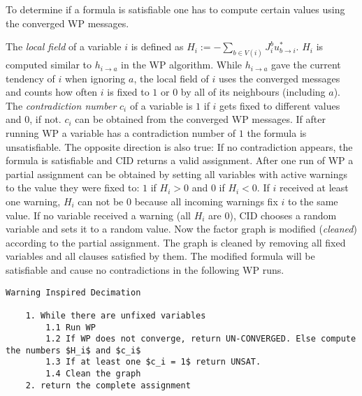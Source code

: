 To determine if a formula is satisfiable one has to compute certain values using the converged WP messages.

The \emph{local field} of a variable $i$ is defined as $H_i := - \sum_{b \in V(i)} J_i^b u^\ast_{b\rightarrow i}$. \newline $H_i$ is computed similar to $h_{i \rightarrow a}$ in the WP algorithm. While 
$h_{i \rightarrow a}$ gave the current tendency of $i$ when ignoring $a$, the local field of $i$ uses the converged messages and counts how often $i$ is fixed to $1$ or $0$ by all of its neighbours (including $a$). \newline
The \emph{contradiction number} $c_i$ of a variable is $1$ if $i$ gets fixed to different values and $0$, if not. $c_i$ can be obtained from the converged WP messages. If after running WP a variable has a contradiction number of $1$ the formula is unsatisfiable. \newline
The opposite direction is also true: If no contradiction appears, the formula is satisfiable and CID returns a valid assignment. 
After one run of WP a partial assignment can be obtained by setting all variables with active warnings to the value they were fixed to: $1$ if $H_i > 0$ and $0$ if $H_i < 0$. If $i$ received at least one warning, $H_i$ can not be $0$ because all incoming warnings fix $i$ to the same value. If no variable received a warning (all $H_i$ are $0$), CID chooses a random variable and sets it to a random value. \newline
Now the factor graph is modified (\emph{cleaned}) according to the partial assignment. The graph is cleaned by removing all fixed variables and all clauses satisfied by them.  The modified formula will be satisfiable and cause no contradictions in the following WP runs.

\begin{lstlisting}[mathescape=true]
	Warning Inspired Decimation
	
	1. While there are unfixed variables
		1.1 Run WP
		1.2 If WP does not converge, return UN-CONVERGED. Else compute the numbers $H_i$ and $c_i$
		1.3 If at least one $c_i = 1$ return UNSAT.
		1.4 Clean the graph
	2. return the complete assignment
\end{lstlisting}



\newpage